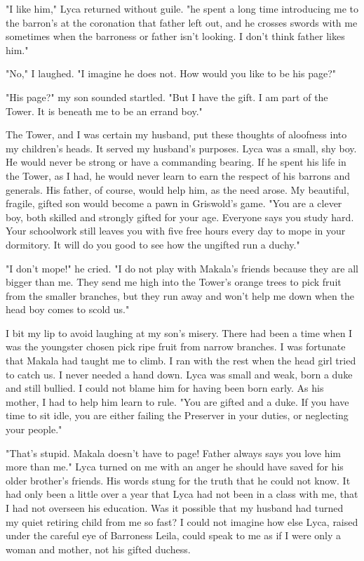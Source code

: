 \documentclass{article}
\begin{document}
"I like him," Lyca returned without guile. "he spent a long time introducing me to the barron's at the coronation that father left out, and he crosses swords with me sometimes when the barroness or father isn't looking. I don't think father likes him."

"No," I laughed. "I imagine he does not. How would you like to be his page?"

"His page?" my son sounded startled. "But I have the gift. I am part of the Tower. It is beneath me to be an errand boy."

The Tower, and I was certain my husband, put these thoughts of aloofness into my children's heads. It served my husband's purposes. Lyca was a small, shy boy. He would never be strong or have a commanding bearing. If he spent his life in the Tower, as I had, he would never learn to earn the respect of his barrons and generals. His father, of course, would help him, as the need arose. My beautiful, fragile, gifted son would become a pawn in Griswold's game. "You are a clever boy, both skilled and strongly gifted for your age. Everyone says you study hard. Your schoolwork still leaves you with five free hours every day to mope in your dormitory. It will do you good to see how the ungifted run a duchy."

"I don't mope!" he cried. "I do not play with Makala's friends because they are all bigger than me. They send me high into the Tower's orange trees to pick fruit from the smaller branches, but they run away and won't help me down when the head boy comes to scold us."

I bit my lip to avoid laughing at my son's misery. There had been a time when I was the youngster chosen pick ripe fruit from narrow branches. I was fortunate that Makala had taught me to climb. I ran with the rest when the head girl tried to catch us. I never needed a hand down. Lyca was small and weak, born a duke and still bullied. I could not blame him for having been born early. As his mother, I had to help him learn to rule. "You are gifted and a duke. If you have time to sit idle, you are either failing the Preserver in your duties, or neglecting your people."

"That's stupid. Makala doesn't have to page! Father always says you love him more than me." Lyca turned on me with an anger he should have saved for his older brother's friends. His words stung for the truth that he could not know. It had only been a little over a year that Lyca had not been in a class with me, that I had not overseen his education. Was it possible that my husband had turned my quiet retiring child from me so fast? I could not imagine how else Lyca, raised under the careful eye of Barroness Leila, could speak to me as if I were only a woman and mother, not his gifted duchess.
\end{document}
